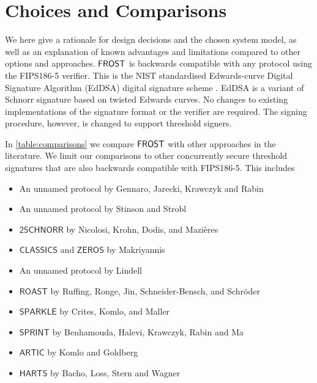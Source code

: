
\section{Choices and Comparisons}\label{section:comparisons}

We here give a rationale for design decisions and the chosen system model, as well as an explanation of known advantages and limitations compared to other options and approaches.
$\mathsf{FROST}$ is backwards compatible with any protocol using the FIPS186-5 verifier.
This is the NIST standardised Edwards-curve Digital Signature Algorithm (EdDSA) digital signature scheme \cite{EdDSA}.
EdDSA is a variant of Schnorr signature based on twisted Edwards curves.
No changes to existing implementations of the signature format or the verifier are required.
The signing procedure, however, is changed to support threshold signers.

In \cref{table:comparisons} we compare $\mathsf{FROST}$ with other approaches in the literature.
We limit our comparisons to other concurrently secure threshold signatures that are also backwards compatible with FIPS186-5.
This includes
\begin{itemize}
	\item An unnamed protocol by Gennaro, Jarecki, Krawczyk and Rabin \cite{GennaroJKR01}
	\item An unnamed protocol by Stinson and Strobl \cite{StinsonS01}
	\item $\mathsf{2SCHNORR}$ by Nicolosi, Krohn, Dodis, and Mazi\`eres \cite{NicolosiKDM03}
	\item $\mathsf{CLASSICS}$ and $\mathsf{ZEROS}$ by Makriyannis \cite{Makriyannis22}
	\item An unnamed protocol by Lindell \cite{Lindell22}
	\item $\mathsf{ROAST}$ by Ruffing, Ronge, Jin, Schneider{-}Bensch, and Schr{\"{o}}der \cite{RuffingRJSS22}
	\item $\mathsf{SPARKLE}$ by Crites, Komlo, and Maller \cite{CritesKM23}
	\item $\mathsf{SPRINT}$ by Benhamouda, Halevi, Krawczyk, Rabin and Ma \cite{BenhamoudaHKRM23}
	\item $\mathsf{ARTIC}$ by Komlo and Goldberg \cite{KomloG24}
	\item $\mathsf{HARTS}$ by Bacho, Loss, Stern and Wagner \cite{BachoLSW24}
\end{itemize}


